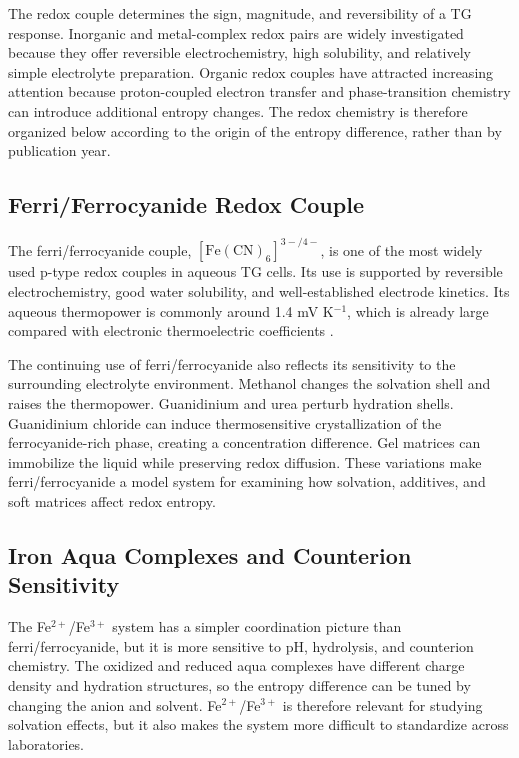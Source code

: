 The redox couple determines the sign, magnitude, and reversibility of a TG
response. Inorganic and metal-complex redox pairs are widely investigated
because they offer reversible electrochemistry, high solubility, and relatively
simple electrolyte preparation. Organic redox couples have attracted increasing
attention because proton-coupled electron transfer and phase-transition
chemistry can introduce additional entropy changes. The redox chemistry is
therefore organized below according to the origin of the entropy difference,
rather than by publication year.

\subsection{Ferri/Ferrocyanide Redox Couple}

The ferri/ferrocyanide couple, $[\mathrm{Fe(CN)}_6]^{3-/4-}$, is one of the
most widely used p-type redox couples in aqueous TG cells. Its use is supported
by reversible electrochemistry, good water solubility, and well-established
electrode kinetics. Its aqueous thermopower is commonly around 1.4 mV K$^{-1}$,
which is already large compared with electronic thermoelectric coefficients
\citep{duan2018aqueous}.

The continuing use of ferri/ferrocyanide also reflects its sensitivity to the
surrounding electrolyte environment. Methanol changes the solvation shell and
raises the thermopower. Guanidinium and urea perturb hydration shells.
Guanidinium chloride can induce thermosensitive crystallization of the
ferrocyanide-rich phase, creating a concentration difference. Gel matrices can
immobilize the liquid while preserving redox diffusion. These variations make
ferri/ferrocyanide a model system for examining how solvation, additives, and
soft matrices affect redox entropy.

\subsection{Iron Aqua Complexes and Counterion Sensitivity}

The Fe$^{2+}$/Fe$^{3+}$ system has a simpler coordination picture than
ferri/ferrocyanide, but it is more sensitive to pH, hydrolysis, and counterion
chemistry. The oxidized and reduced aqua complexes have different charge
density and hydration structures, so the entropy difference can be tuned by
changing the anion and solvent. Fe$^{2+}$/Fe$^{3+}$ is therefore relevant for
studying solvation effects, but it also makes the system more difficult to
standardize across laboratories.

